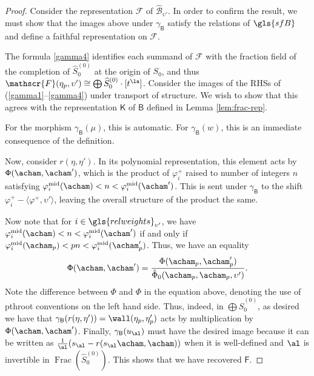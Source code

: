   
  \begin{proof}
  Consider the representation $\mathscr{F}$ of  $\widehat{\mathscr{B}}_{\upsilon'}$.  In order to confirm the result, we must show that the images above under $\gamma_{\mathsf{B}}$ satisfy the relations of $\gls{sfB}$ and define a faithful representation on $\mathscr{F}$. 
  
  The formula \ref{gamma4} identifies each summand of $\mathscr{F}$ with the fraction field of the completion of $\widehat{S}_0^{(0)}$ at the origin of $S_0$, and thus $\mathscr{F}(\eta_p,\upsilon')\cong \bigoplus \widehat{S}_0^{(0)}\cdot [t^\la]$.  Consider the images of the RHSs of (\ref{gamma1}--\ref{gamma4}) under transport of structure.  We wish to show that this agrees with the representation $\mathsf{K}$ of $\mathsf{B}$ defined in Lemma \ref{lem:frac-rep}.  
  
For the morphism $\gamma_{\mathsf{B}}(\mu)$, this is automatic.  For $\gamma_{\mathsf{B}}(w)$, this is an immediate consequence of the definition.  
  
Now, consider $r(\eta,\eta')$.  In its polynomial
representation, this element acts by
${\mathsf{\Phi}(\acham,\acham')}$, which is the product of $\varphi_i^+$ raised to number of
integers $n$ satisfying ${\varphi}^{\operatorname{mid}}_i(\acham)< n<
{\varphi}^{\operatorname{mid}}_i(\acham')$.  This is sent under
$\gamma_{\mathsf{B}}$ to the shift $\varphi_i^+-\langle
\varphi^+,\upsilon'\rangle$, leaving the overall structure of the
product the same.  

Now note that for $i\in \gls{relweights}_{\upsilon'}$, we have ${\varphi}^{\operatorname{mid}}_i(\acham)< n< {\varphi}^{\operatorname{mid}}_i(\acham')$ if and only if $\varphi^{\operatorname{mid}}_i(\acham_p)< pn< \varphi^{\operatorname{mid}}_i(\acham'_p)$.  
Thus, we have an equality  \[{\mathsf{\Phi}(\acham,\acham')}=\frac{{\Phi}(\acham_p,\acham'_p)}{\hat{\Phi}_0(\acham_p,\acham_p,\upsilon')}.\]
Note the difference between $\mathsf{\Phi}$ and $\Phi$ in the equation above, denoting the use of \gls{pthroot} conventions on the left hand side.  Thus, indeed, in $\bigoplus \widehat{S}_0^{(0)}$, as desired we have that $\gamma_{\mathsf{B}}(r(\eta,\eta'))=\wall(\eta_p,\eta_p')$ acts by multiplication by $\mathsf{\Phi}(\acham,\acham')$.  Finally, $\gamma_{\mathsf{B}}(u_\al)$ must have the desired image because it can be written as $\frac{1}{\al}(s_{\al}-r(s_\al\acham,\acham))$ when it is well-defined and $\al$ is invertible in $\operatorname{Frac}(\widehat{S}_0^{(0)}).$  This shows that we have recovered $\mathsf{F}$.


\end{proof}
